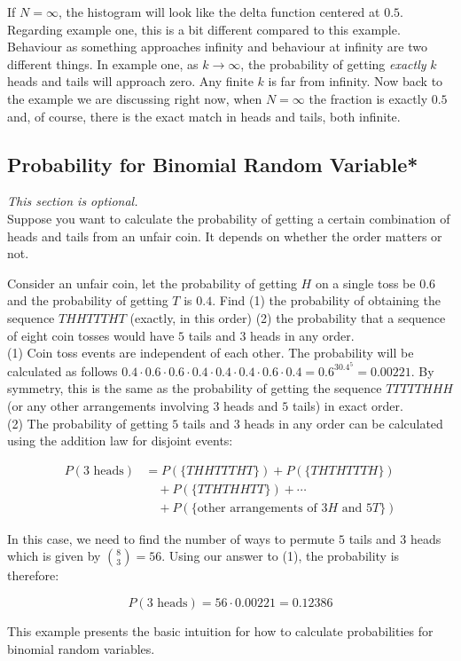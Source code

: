 If $N = \infty$, the histogram will look like the delta function centered at $0.5$. \\

Regarding example one, this is a bit different compared to this example. Behaviour as something approaches infinity and behaviour at infinity are two different things. In example one, as $k\to\infty$, the probability of getting \textit{exactly} $k$ heads and tails will approach zero. Any finite $k$ is far from infinity. Now back to the example we are discussing right now, when $N = \infty$ the fraction is exactly $0.5$ and, of course, there is the exact match in heads and tails, both infinite.

\subsection{Probability for Binomial Random Variable*}

\textit{This section is optional.} \\

Suppose you want to calculate the probability of getting a certain combination of heads and tails from an unfair coin. It depends on whether the order matters or not.

\begin{texample}
	Consider an unfair coin, let the probability of getting $H$ on a single toss be $0.6$ and the probability of getting $T$ is $0.4$. Find (1) the probability of obtaining the sequence $THHTTTHT$ (exactly, in this order) (2) the probability that a sequence of eight coin tosses would have $5$ tails and $3$ heads in any order. \\
	
	(1) Coin toss events are independent of each other. The probability will be calculated as follows $0.4\cdot0.6\cdot0.6\cdot0.4\cdot0.4\cdot0.4\cdot0.6\cdot0.4=0.6^30.4^5=0.00221$. By symmetry, this is the same as the probability of getting the sequence $TTTTTHHH$ (or any other arrangements involving $3$ heads and $5$ tails) in exact order. \\
	
	(2) The probability of getting $5$ tails and $3$ heads in any order can be calculated using the addition law for disjoint events:
	
	\begin{align*}
		P(\text{$3$ heads})&=P(\{THHTTTHT\}) + P(\{THTHTTTH\}) \\
		&\quad+ P(\{TTHTHHTT\}) + \cdots \\
		&\quad + P(\{\text{other arrangements of $3H$ and $5T$}\})
	\end{align*}
	
	In this case, we need to find the number of ways to permute $5$ tails and $3$ heads which is given by $\binom{8}{3}=56$. Using our answer to (1), the probability is therefore:
	
	$$P(\text{$3$ heads})=56\cdot0.00221=0.12386$$
	
	This example presents the basic intuition for how to calculate probabilities for binomial random variables.
\end{texample}

